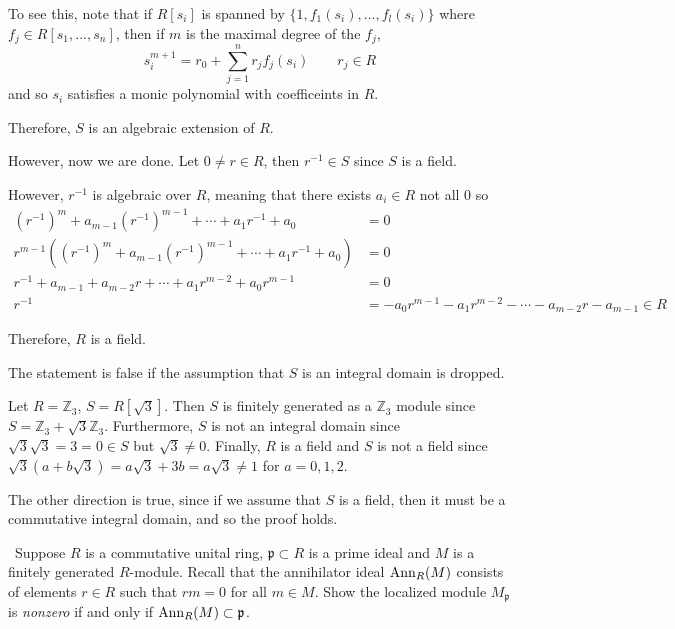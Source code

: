 \documentclass[12pt]{Qual}
\begin{document}
\begin{solution}
To see this, note that if $R[s_i]$ is spanned by $\{1,f_1(s_i),...,f_l(s_i)\}$ where $f_j\in R[s_1,...,s_n]$, then if $m$ is the maximal degree of the $f_j$, $$s_i^{m+1}=r_0+\sum_{j=1}^nr_jf_j(s_i)\qquad r_j\in R$$ and so $s_i$ satisfies a monic polynomial with coefficeints in $R$.

Therefore, $S$ is an algebraic extension of $R$.

However, now we are done. Let $0\not=r\in R$, then $r^{-1}\in S$ since $S$ is a field.

However, $r^{-1}$ is algebraic over $R$, meaning that there exists $a_i\in R$ not all $0$ so \begin{align*}
    (r^{-1})^m+a_{m-1}(r^{-1})^{m-1}+\cdots+a_1r^{-1}+a_0&=0\\
     r^{m-1}((r^{-1})^m+a_{m-1}(r^{-1})^{m-1}+\cdots+a_1r^{-1}+a_0)&=0\\
     r^{-1}+a_{m-1}+a_{m-2}r+\cdots+a_1r^{m-2}+a_0r^{m-1}&=0\\
     r^{-1}&=-a_0r^{m-1}-a_1r^{m-2}-\cdots-a_{m-2}r-a_{m-1}\in R
\end{align*}

Therefore, $R$ is a field.

\begin{mybox}
The statement is false if the assumption that $S$ is an integral domain is dropped.

\boxed{\centernot\implies} Let $R=\mathbb{Z}_3$, $S=R[\sqrt{3}]$. Then $S$ is finitely generated as a $\mathbb{Z}_3$ module since $S=\mathbb{Z}_3+\sqrt{3}\mathbb{Z}_3$. Furthermore, $S$ is not an integral domain since $\sqrt{3}\sqrt{3}=3=0\in S$ but $\sqrt{3}\not=0$. Finally, $R$ is a field and $S$ is not a field since $\sqrt{3}(a+b\sqrt{3})=a\sqrt{3}+3b=a\sqrt{3}\not=1$ for $a=0,1,2$.

\boxed{\impliedby} The other direction is true, since if we assume that $S$ is a field, then it must be a commutative integral domain, and so the proof holds.
\end{mybox}

\end{solution}
\newpage


\begin{problem} $\,$
Suppose $R$ is a commutative unital ring, $\mathfrak{p}\subset R$ is a prime ideal and $M$ is a finitely generated $R$-module. Recall that the annihilator ideal $\text{Ann}_R(M)$ consists of elements $r\in R$ such that $rm=0$ for all $m\in M$. Show the localized module $M_\mathfrak{p}$ is \textit{nonzero} if and only if $\text{Ann}_R(M)\subset\mathfrak{p}$.
\end{problem}
\end{document}
